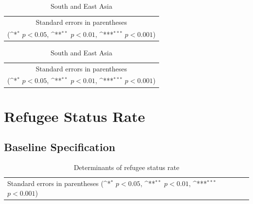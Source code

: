 \documentclass[10pt,a4paper]{scrartcl}
\begin{document}
\begin{table}[!ht]\centering
	\footnotesize
	\renewcommand{\arraystretch}{1.1}
	\def\sym#1{\ifmmode^{#1}\else\(^{#1}\)\fi}
	\caption{Acceptance Rate: Predicted Pattern}
	\begin{subtable}{.5\linewidth}
		\centering
		\caption{Europe and Central Asia}
		\begin{tabular}{l*{2}{c}}
			\hline\hline
			
			\hline\hline
			\multicolumn{3}{c}{\footnotesize Standard errors in parentheses} \\
			\multicolumn{3}{c}{\footnotesize (\sym{*} \(p<0.05\), \sym{**} \(p<0.01\), \sym{***} \(p<0.001\))}\\
		\end{tabular}
	\end{subtable}%
	\begin{subtable}{.5\linewidth}
		\centering
		\caption{South and East Asia}
		\begin{tabular}{l*{2}{c}}
			\hline\hline
			
			\hline\hline
			\multicolumn{3}{c}{\footnotesize Standard errors in parentheses} \\
			\multicolumn{3}{c}{\footnotesize (\sym{*} \(p<0.05\), \sym{**} \(p<0.01\), \sym{***} \(p<0.001\))}\\
		\end{tabular}
	\end{subtable}%
\end{table}



\clearpage
\FloatBarrier
\section{Refugee Status Rate}
\subsection{Baseline Specification}
\begin{table}[!ht]\centering
	\renewcommand{\arraystretch}{1.25}
	\small
	\def\sym#1{\ifmmode^{#1}\else\(^{#1}\)\fi}
	\caption{Determinants of refugee status rate}
	\begin{tabular}{l*{3}{c}}
		\hline\hline
		
		\hline\hline
		\multicolumn{4}{l}{\footnotesize Standard errors in parentheses (\sym{*} \(p<0.05\), \sym{**} \(p<0.01\), \sym{***} \(p<0.001\))}\\
	\end{tabular}
\end{table}
\end{document}
